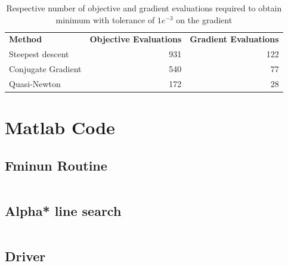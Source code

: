 \documentclass{article}
\begin{document}
\begin{table}[H]
	\centering
	\caption{Respective number of objective and gradient evaluations required to obtain minimum with tolerance of $1e^{-3}$ on the gradient}
	\label{my-label}
	\begin{tabular}{|l|r|r|}
		\hline
		\textbf{Method}    & \textbf{Objective Evaluations} & \textbf{Gradient Evaluations} \\
		Steepest descent   &                            931 &                           122 \\
		Conjugate Gradient &                            540 &                            77 \\
		Quasi-Newton       &                            172 &                            28 \\ \hline
	\end{tabular}
\end{table}


\section{Matlab Code}

\subsection{Fminun Routine}
\inputminted[xleftmargin=10pt,linenos]{matlab}{fminun.m}
\subsection{Alpha* line search}
\inputminted[xleftmargin=10pt, linenos]{matlab}{aPrime.m}
\subsection{Driver}
\inputminted[xleftmargin=10pt,linenos]{matlab}{fminunDriv.m}


\end{document}
